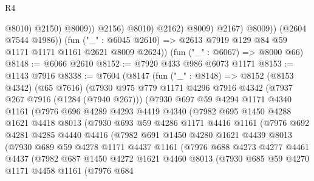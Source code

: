 \begin{lexlean}{R4}
\begin{coremodule}
                              @8010)
                            @2150)
                          @8009))
                      @2156)
                    @8010)
                  @2162)
                @8009)
              @2167)
            @8009))
        (@2604 @7544 @1986))
      (fun ("_" : @6045 @2610) => @2613 @7919 @129 @84 @59 @1171 @1171 @1161 @2621 @8009 @2624))
    (fun ("_" : @6067) => @8000 @66)
@8148 := @6066 @2610
@8152 := @7920 @433 @986 @6073 @1171
@8153 := @1143 @7916
@8338 := @7604
    (@8147
      (fun ("_" : @8148) =>
      @8152
        (@8153 @4342)
        (@65 @7616)
        (@7930
          @975
          @779
          @1171
          @4296
          @7916
          @4342
          (@7937 @267 @7916 (@1284 (@7940 @267)))
          (@7930
            @697
            @59
            @4294
            @1171
            @4340
            @1161
            (@7976
              @696
              @4289
              @4293
              @4419
              @4340
              (@7982
                @695
                @1450
                @4288
                @1621
                @4418
                @8013
                (@7930
                  @693
                  @59
                  @4286
                  @1171
                  @4416
                  @1161
                  (@7976
                    @692
                    @4281
                    @4285
                    @4440
                    @4416
                    (@7982
                      @691
                      @1450
                      @4280
                      @1621
                      @4439
                      @8013
                      (@7930
                        @689
                        @59
                        @4278
                        @1171
                        @4437
                        @1161
                        (@7976
                          @688
                          @4273
                          @4277
                          @4461
                          @4437
                          (@7982
                            @687
                            @1450
                            @4272
                            @1621
                            @4460
                            @8013
                            (@7930
                              @685
                              @59
                              @4270
                              @1171
                              @4458
                              @1161
                              (@7976
                                @684

\end{coremodule}
\end{lexlean}
